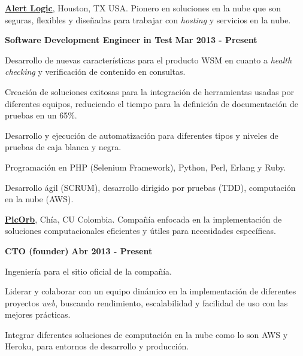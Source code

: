\href{http://alertlogic.com/}{\textbf{Alert Logic}}, Houston, TX USA. Pionero
en soluciones en la nube que son seguras, flexibles y dise\~nadas para trabajar
con \textit{hosting} y servicios en la nube.
\begin{outerlist}
\item[] \textbf{Software Development Engineer in Test} \hfill \textbf{Mar 2013 -
Present}
    \begin{innerlist}
\item Desarrollo de nuevas caracter\'isticas para el producto WSM en cuanto a
\textit{health checking} y verificaci\'on de contenido en consultas.
\item Creaci\'on de soluciones exitosas para la integraci\'on de herramientas usadas
por diferentes equipos, reduciendo el tiempo para la definici\'on de
documentaci\'on de pruebas en un 65\%.
\item Desarrollo y ejecuci\'on de automatizaci\'on para diferentes tipos y niveles
de pruebas de caja blanca y negra.
\item Programaci\'on en PHP (Selenium Framework), Python, Perl, Erlang y Ruby.
\item Desarrollo \'agil (SCRUM), desarrollo dirigido por pruebas (TDD),
computaci\'on en la nube (AWS).
    \end{innerlist}
\end{outerlist}

\quarterblankline

\href{http://www.picorb.com/}{\textbf{PicOrb}}, Ch\'ia, CU Colombia.
Compa\~n\'ia enfocada en la implementaci\'on de soluciones computacionales
eficientes y \'utiles para necesidades espec\'ificas.
\begin{outerlist}
\item[] \textbf{CTO (founder)} \hfill \textbf{Abr 2013 -
Present}
    \begin{innerlist}
\item Ingenier\'ia para el sitio oficial de la compa\~n\'ia.
\item Liderar y colaborar con un equipo din\'amico en la implementaci\'on de
diferentes proyectos \textit{web}, buscando rendimiento, escalabilidad y
facilidad de uso con las mejores pr\'acticas.
\item Integrar diferentes soluciones de computaci\'on en la nube como lo son
AWS y Heroku, para entornos de desarrollo y producci\'on.
    \end{innerlist}
\end{outerlist}

